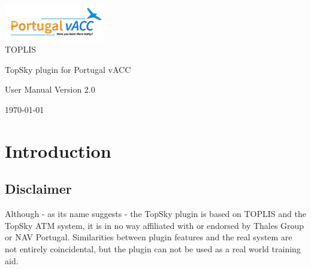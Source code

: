 \documentclass[11pt,a4paper,oldfontcommands]{memoir}
\begin{document}
%
%
\thispagestyle{empty}

{%
\sffamily

\centering
\Large

~\vspace{\fill}

{\huge 
\includegraphics{img/logo.png}\\
TOPLIS
}

\vspace{2.5cm}

{\LARGE
TopSky plugin for Portugal vACC
}

\vspace{3.5cm}

User Manual
\medskip
Version 2.0
\medskip

\vspace{\fill}

\coverdate\today

}%

\cleardoublepage

\tableofcontents*

\clearpage


\chapter{Introduction}

\section{Disclaimer}
Although - as its name suggests - the TopSky plugin is based on TOPLIS and the TopSky ATM system, it is in no way affiliated with or endorsed by Thales Group or NAV Portugal. Similarities between plugin features and the real system are not entirely coincidental, but the plugin can not be used as a real world training aid.
\end{document}
